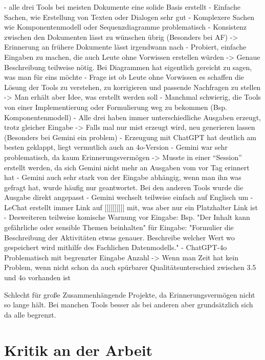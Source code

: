 - alle drei Tools bei meisten Dokumente eine solide Basis erstellt
- Einfache Sachen, wie Erstellung von Texten oder Dialogen sehr gut
- Komplexere Sachen wie Komponentenmodell oder Sequenzdiagramme problematisch
- Konsistenz zwischen den Dokumenten lässt zu wünschen übrig (Besonders bei AF) -> Erinnerung an frühere 
Dokumente lässt irgendwann nach
- Probiert, einfache Eingaben zu machen, die auch Leute ohne Vorwissen erstellen würden
-> Genaue Beschreibung teilweise nötig. Bei Diagrammen hat eigentlich gereicht zu sagen, was man für eins 
möchte
- Frage ist ob Leute ohne Vorwissen es schaffen die Lösung der Tools zu verstehen, zu korrigieren und passende 
Nachfragen zu stellen
-> Man erhält aber Idee, was erstellt werden soll
- Manchmal schwierig, die Tools von einer Implementierung oder Formulierung weg zu bekommen (Bsp. Komponentenmodell)
- Alle drei haben immer unterschiedliche Ausgaben erzeugt, trotz gleicher Eingabe
-> Falls mal nur mist erzeugt wird, neu generieren lassen (Besonders bei Gemini ein problem)
- Erzeugung mit ChatGPT hat deutlich am besten geklappt, liegt vermutlich auch an 4o-Version
- Gemini war sehr problematisch, da kaum Erinnerungsvermögen
-> Musste in einer ``Session'' erstellt werden, da sich Gemini nicht mehr an Ausgaben vom vor Tag erinnert hat
- Gemini auch sehr stark von der Eingabe abhängig, wenn man ihn was gefragt hat, wurde häufig nur geantwortet. Bei den 
anderen Tools wurde die Ausgabe direkt angepasst
- Gemini wechselt teilweise einfach auf Englisch um
- LeChat erstellt immer Link auf [[[[[]]]]] mit, was aber nur ein Platzhalter Link ist
- Desweiteren teilweise komische Warnung vor Eingabe: Bsp. "Der Inhalt kann gefährliche oder sensible Themen beinhalten" für Eingabe:
"Formulier die Beschreibung der Aktivitäten etwas genauer. Beschreibe welcher Wert wo gespeichert wird mithilfe des Fachlichen Datenmodells."
- ChatGPT-4o Problematisch mit begrenzter Eingabe Anzahl 
-> Wenn man Zeit hat kein Problem, wenn nicht schon da auch spürbarer Qualitätsunterschied zwischen 3.5 und 4o vorhanden ist

Schlecht für große Zusammenhängende Projekte, da Erinnerungsvermögen nicht so lange hält. Bei manchen Tools besser als bei anderen 
aber grundsätzlich sich da alle begrenzt.

\section{Kritik an der Arbeit}  \label{Kritik an der Arbeit}

